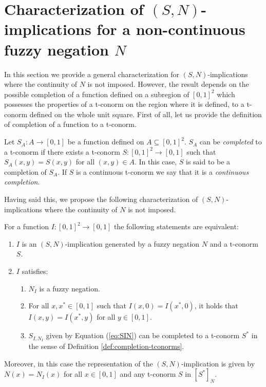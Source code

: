 \section{Characterization of $(S,N)$-implications for a non-continuous fuzzy negation $N$}\label{section:characterization1}

In this section we provide a general characterization for $(S,N)$-implications where the continuity of $N$ is not imposed. However, the result depends on the possible completion of a function defined on a subregion of $[0,1]^2$ which possesses the properties of a t-conorm on the region where it is defined, to a t-conorm defined on the whole unit square. First of all, let us provide the definition of completion of a function to a t-conorm.

\begin{definition}\label{def:completion-tconorms} Let $S_A:A \to [0,1]$ be a function defined on $A \subseteq [0,1]^2$. $S_A$ can be \emph{completed} to a t-conorm if there exists a t-conorm $S:[0,1]^2 \to [0,1]$ such that $S_A(x,y)=S(x,y)$ for all $(x,y) \in A$. In this case, $S$ is said to be a completion of $S_A$. If $S$ is a continuous t-conorm we say that it is a \emph{continuous completion}.
\end{definition}

Having said this, we propose the following characterization of $(S,N)$-implications where the continuity of $N$ is not imposed.

\begin{theorem}\label{th:characterization(S,N)} For a function $I:[0,1]^2 \to [0,1]$ the following statements are equivalent:
	\begin{enumerate}[label=(\roman*)]
		\item $I$ is an $(S,N)$-implication generated by a fuzzy negation $N$ and a t-conorm $S$.
		\item $I$ satisfies:
		\begin{enumerate}[label=(\alph*)]
			\item $N_I$ is a fuzzy negation.
			\item  For all $x,x^*\in[0,1]$ such that $I(x,0)=I(x^*,0)$, it holds that $I(x,y)=I(x^*,y)$ for all $y\in[0,1]$.
			\item $S_{I,N_I}$ given by Equation (\ref{eq:SIN}) can be completed to a t-conorm $S^*$ in the sense of Definition \ref{def:completion-tconorms}.
		\end{enumerate}
	\end{enumerate}
	Moreover, in this case the representation of the $(S,N)$-implication is given by $N(x)=N_I(x)$ for all $x \in [0,1]$ and any t-conorm $S$ in $[S^*]_N$.
\end{theorem}

